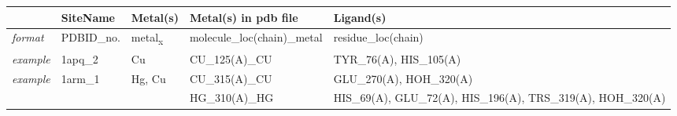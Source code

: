 \begin{tabular}{lllL{5cm}L{2.5cm}}
  \toprule
  & SiteName & Metal(s) & Metal(s) in pdb file & Ligand(s) \\
  \midrule
  \textit{format}
    & PDBID\_no.
    & metal\textsubscript{x}
    & molecule\_loc(chain)\_metal
    & residue\_loc(chain)\\
  \textit{example}
    & 1apq\_2
    & Cu
    & CU\_125(A)\_CU
    & TYR\_76(A), HIS\_105(A) \\
  \textit{example}
    & 1arm\_1 & Hg, Cu
    & CU\_315(A)\_CU
    & GLU\_270(A), HOH\_320(A) \\
    & &
    & HG\_310(A)\_HG
    & HIS\_69(A), GLU\_72(A), HIS\_196(A), TRS\_319(A), HOH\_320(A) \\
  \bottomrule
\end{tabular}
